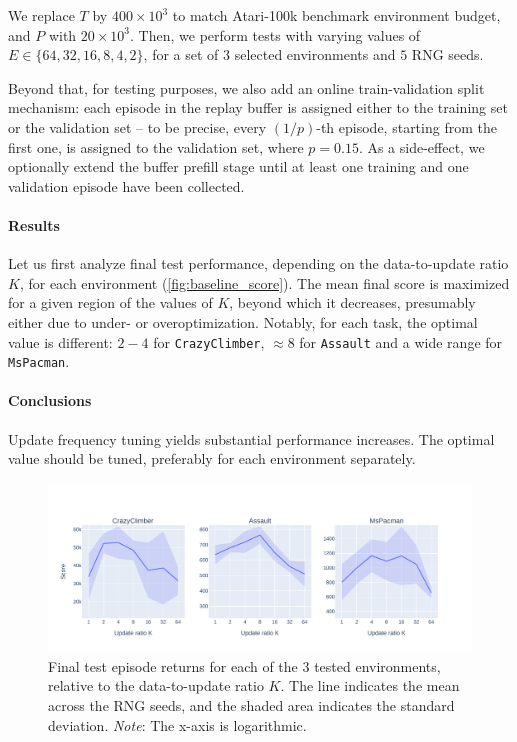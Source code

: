 \documentclass[en]{pracamgr}
\newcommand{\env}[1]{{\tt #1}}
\newcommand{\figurewidth}{\linewidth}
\newcommand{\figureheight}{0.8\paperheight}
\begin{document}
We replace $T$ by $400 \times 10^3$ to match Atari-100k benchmark environment budget, and $P$ with $20 \times 10^3$. Then, we perform tests with varying values of $E \in \{64, 32, 16, 8, 4, 2\}$, for a set of $3$ selected environments and $5$ RNG seeds.

Beyond that, for testing purposes, we also add an online train-validation split mechanism: each episode in the replay buffer is assigned either to the training set or the validation set -- to be precise, every $(1/p)$-th episode, starting from the first one, is assigned to the validation set, where $p = 0.15$. As a side-effect, we optionally extend the buffer prefill stage until at least one training and one validation episode have been collected.

\paragraph{Results} Let us first analyze final test performance, depending on the data-to-update ratio $K$, for each environment (\autoref{fig:baseline_score}). The mean final score is maximized for a given region of the values of $K$, beyond which it decreases, presumably either due to under- or overoptimization. Notably, for each task, the optimal value is different: $2-4$ for \env{CrazyClimber}, $\approx 8$ for \env{Assault} and a wide range for \env{MsPacman}.

\paragraph{Conclusions} Update frequency tuning yields substantial performance increases. The optimal value should be tuned, preferably for each environment separately.

\begin{figure}
  \centering
  \includegraphics[width=\figurewidth,height=\figureheight,keepaspectratio]{assets/baseline_score.pdf}
  \caption{Final test episode returns for each of the 3 tested environments, relative to the data-to-update ratio $K$. The line indicates the mean across the RNG seeds, and the shaded area indicates the standard deviation. \emph{Note}: The x-axis is logarithmic.}
  \label{fig:baseline_score}
\end{figure}
\end{document}

